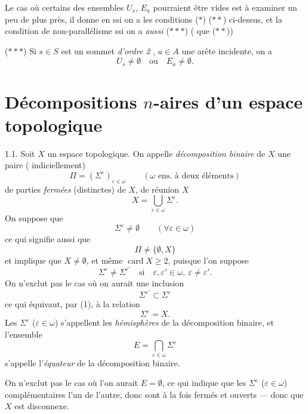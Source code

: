 \documentclass[11pt,a4paper]{article}
\begin{document}
Le cas où certains des ensembles $U_{s}$, $E_{a}$ pourraient être vides est à
examiner un peu de plus près, il donne  \ill{} en
  ssi on a les conditions ($*$) ($**$)
ci-dessus, et la condition de non-parallélisme  ssi on a
\emph{aussi} ($***$) ( que ($**$))

($***$) Si $s\in S$ est un sommet \emph{d'ordre 2} , $a\in A$
une arête incidente, on a 
\[
  U_{s}\neq\emptyset\quad\text{ou}\quad E_{a}\neq\emptyset .
\]

\section{Décompositions $n$-aires d'un espace topologique}

1.1. Soit $X$ un espace topologique. On appelle \emph{décomposition binaire}
de $X$ une paire ( indiciellement)
\[
  \Pi=(\Sigma^{\varepsilon})_{\varepsilon\in\omega}\qquad(\omega\text{ ens.\ à deux éléments})
\]
de  parties \emph{fermées} (distinctes) de $X$, de réunion
$X$
\[
  X=\bigcup_{\varepsilon\in\omega}\Sigma^{\varepsilon} .
  \tag{1}
\]
On suppose que
\[
  \Sigma^{\varepsilon}\neq\emptyset\qquad(\forall\varepsilon\in\omega)
  \tag{2}
\]
ce qui signifie aussi que
\[
  \Pi\neq\{\emptyset,X\}
  \tag{2'}
\]
et implique que $X\neq\emptyset$, et même $\operatorname{card} X\geqslant2$,
puisque l'on suppose
\[
  \Sigma^{\varepsilon}\neq\Sigma^{\varepsilon'}\quad\text{si}\quad
  \varepsilon,\varepsilon'\in\omega,\ \varepsilon\neq\varepsilon' .
  \tag{3}
\]
On n'exclut pas le cas où on aurait une inclusion
\[
  \Sigma^{\varepsilon'}\subset\Sigma^{\varepsilon}
\]
ce qui équivaut, par (1), à la relation
\[
  \Sigma^{\varepsilon}=X .
\]
Les $\Sigma^{\varepsilon}$ ($\varepsilon\in\omega$) s'appellent les
\emph{hémisphères} de la décomposition binaire, \struck{\ill{}} et l'ensemble
\[
  E=\bigcap_{\varepsilon\in\omega}\Sigma^{\varepsilon}
  \tag{4}
\]
s'appelle l'\emph{équateur} de la décomposition binaire.

On n'exclut pas le cas où l'on aurait $E=\emptyset$, ce qui indique que les
$\Sigma^{\varepsilon}$ ($\varepsilon\in\omega$) complémentaires
l'un de l'autre, donc sont à la fois fermés et ouverts — donc que $X$ est
disconnexe.
\end{document}
